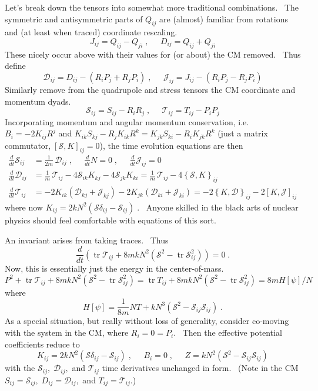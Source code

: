 \documentclass[a4paper,12pt]{article}%
\begin{document}
Let's break down the tensors into somewhat more traditional combinations.
\ The symmetric and antisymmetric parts of $Q_{ij}$ are (almost) familiar from
rotations and (at least when traced) coordinate rescaling. \
\[
J_{ij}=Q_{ij}-Q_{ji}\;,\;\;\;\;\;D_{ij}=Q_{ij}+Q_{ji}%
\]
These nicely occur above with their values for (or about) the CM removed.
\ Thus define
\[
\mathcal{D}_{ij}=D_{ij}-\left(  R_{i}P_{j}+R_{j}P_{i}\right)
\;,\;\;\;\;\;\mathcal{J}_{ij}=J_{ij}-\left(  R_{i}P_{j}-R_{j}P_{i}\right)
\]
Similarly remove from the quadrupole and stress tensors the CM coordinate and
momentum dyads.
\[
\mathcal{S}_{ij}=S_{ij}-R_{i}R_{j}\;,\;\;\;\;\;\mathcal{T}_{ij}=T_{ij}%
-P_{i}P_{j}%
\]
Incorporating momentum and angular momentum conservation, i.e. $B_{i}%
=-2K_{ij}R^{j}$ and $K_{ik}S_{kj}-R_{j}K_{ik}R^{k}=K_{jk}S_{ki}-R_{i}%
K_{jk}R^{k}$ (just a matrix commutator,$\;\left[  \mathcal{S},K\right]
_{ij}=0$), the time evolution equations are then
\begin{align}
\frac{d}{dt}\mathcal{S}_{ij} &  =\frac{1}{2m}\,\mathcal{D}_{ij}%
\;,\;\;\;\;\;\frac{d}{dt}N=0\;,\;\;\;\;\;\frac{d}{dt}\mathcal{J}%
_{ij}=0\label{AnisotropicEqns}\\
\frac{d}{dt}\mathcal{D}_{ij} &  =\frac{1}{m}\,\mathcal{T}_{ij}-4\mathcal{S}%
_{ik}K_{kj}-4\mathcal{S}_{jk}K_{ki}=\frac{1}{m}\,\mathcal{T}_{ij}-4\left\{
\mathcal{S},K\right\}  _{ij}\nonumber\\
\frac{d}{dt}\mathcal{T}_{ij} &  =-2K_{ik}\left(  \mathcal{D}_{kj}%
+\mathcal{J}_{kj}\right)  -2K_{jk}\left(  \mathcal{D}_{ki}+\mathcal{J}%
_{ki}\right)  =-2\left\{  K,\mathcal{D}\right\}  _{ij}-2\left[  K,\mathcal{J}%
\right]  _{ij}\nonumber
\end{align}
where now $K_{ij}=2kN^{2}\left(  \mathcal{S}\delta_{ij}-\mathcal{S}%
_{ij}\right)  \;$. \ Anyone skilled in the black arts of nuclear physics
should feel comfortable with equations of this sort.

An invariant arises from taking traces. \ Thus%
\[
\frac{d}{dt}\left(  \operatorname*{tr}\mathcal{T}_{ij}+8mkN^{2}\left(
\mathcal{S}^{2}-\operatorname*{tr}\mathcal{S}_{ij}^{2}\right)  \right)  =0\;.
\]
Now, this is essentially just the energy in the center-of-mass.%
\[
P^{2}+\operatorname*{tr}\mathcal{T}_{ij}+8mkN^{2}\left(  \mathcal{S}%
^{2}-\operatorname*{tr}\mathcal{S}_{ij}^{2}\right)  =\operatorname*{tr}%
T_{ij}+8mkN^{2}\left(  \mathcal{S}^{2}-\operatorname*{tr}\mathcal{S}_{ij}%
^{2}\right)  =8mH[\psi]/N
\]
where%
\[
H[\psi]=\frac{1}{8m}NT+kN^{3}\left(  \mathcal{S}^{2}-\mathcal{S}%
_{ij}\mathcal{S}_{ij}\right)  \;.
\]
As a special situation, but really without loss of generality, consider
co-moving with the system in the CM, where $R_{i}=0=P_{i}$. \ Then the
effective potential coefficients reduce to
\[
K_{ij}=2kN^{2}\left(  \mathcal{S}\delta_{ij}-\mathcal{S}_{ij}\right)
\;,\;\;\;\;\;B_{i}=0\;,\;\;\;\;\;Z=kN^{2}\left(  \mathcal{S}^{2}%
-\mathcal{S}_{ij}\mathcal{S}_{ij}\right)
\]
with the $\mathcal{S}_{ij},\;\mathcal{D}_{ij},$ and $\mathcal{T}_{ij}$ time
derivatives unchanged in form. \ (Note in the CM $S_{ij}=\mathcal{S}%
_{ij},\;D_{ij}=\mathcal{D}_{ij},$ and $T_{ij}=\mathcal{T}_{ij}$.) \ 
\end{document}
